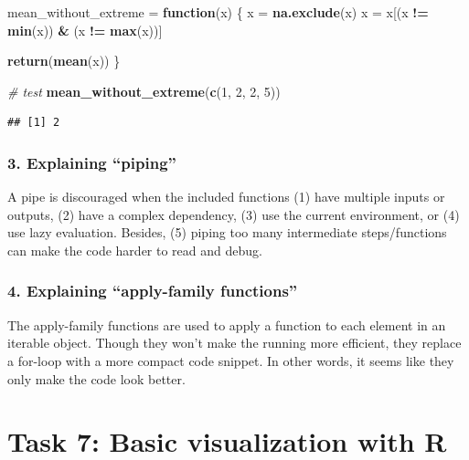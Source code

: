 \documentclass[
]{article}
\newenvironment{Shaded}{\begin{snugshade}}{\end{snugshade}}
\newcommand{\CommentTok}[1]{\textcolor[rgb]{0.56,0.35,0.01}{\textit{#1}}}
\newcommand{\ControlFlowTok}[1]{\textcolor[rgb]{0.13,0.29,0.53}{\textbf{#1}}}
\newcommand{\DecValTok}[1]{\textcolor[rgb]{0.00,0.00,0.81}{#1}}
\newcommand{\FunctionTok}[1]{\textcolor[rgb]{0.13,0.29,0.53}{\textbf{#1}}}
\newcommand{\NormalTok}[1]{#1}
\newcommand{\OtherTok}[1]{\textcolor[rgb]{0.56,0.35,0.01}{#1}}
\newcommand{\SpecialCharTok}[1]{\textcolor[rgb]{0.81,0.36,0.00}{\textbf{#1}}}
\begin{document}
\begin{Shaded}
\begin{Highlighting}[]
\NormalTok{mean\_without\_extreme }\OtherTok{=} \ControlFlowTok{function}\NormalTok{(x) \{}
\NormalTok{  x }\OtherTok{=} \FunctionTok{na.exclude}\NormalTok{(x)}
\NormalTok{  x }\OtherTok{=}\NormalTok{ x[(x }\SpecialCharTok{!=} \FunctionTok{min}\NormalTok{(x)) }\SpecialCharTok{\&}\NormalTok{ (x }\SpecialCharTok{!=} \FunctionTok{max}\NormalTok{(x))]}
  
  \FunctionTok{return}\NormalTok{(}\FunctionTok{mean}\NormalTok{(x))}
\NormalTok{\}}

\CommentTok{\# test}
\FunctionTok{mean\_without\_extreme}\NormalTok{(}\FunctionTok{c}\NormalTok{(}\DecValTok{1}\NormalTok{, }\DecValTok{2}\NormalTok{, }\DecValTok{2}\NormalTok{, }\DecValTok{5}\NormalTok{))}
\end{Highlighting}
\end{Shaded}

\begin{verbatim}
## [1] 2
\end{verbatim}

\subsubsection{3. Explaining ``piping''}\label{explaining-piping}

A pipe is discouraged when the included functions (1) have multiple
inputs or outputs, (2) have a complex dependency, (3) use the current
environment, or (4) use lazy evaluation. Besides, (5) piping too many
intermediate steps/functions can make the code harder to read and debug.

\subsubsection{4. Explaining ``apply-family
functions''}\label{explaining-apply-family-functions}

The apply-family functions are used to apply a function to each element
in an iterable object. Though they won't make the running more
efficient, they replace a for-loop with a more compact code snippet. In
other words, it seems like they only make the code look better.

\section{Task 7: Basic visualization with
R}\label{task-7-basic-visualization-with-r}
\end{document}
